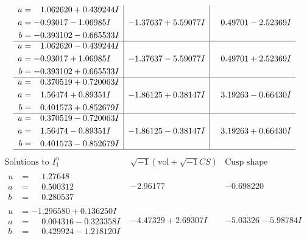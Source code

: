 \documentclass[1p]{elsarticle_modified}
\theoremstyle{definition}
\newcommand{\I}{\sqrt{-1}}
\begin{document}
$$\begin{array}{c|c|c}
\begin{aligned}
u &= \phantom{-}1.062620 + 0.439244 I \\
a &= -0.93017 - 1.06985 I \\
b &= -0.393102 - 0.665533 I\end{aligned}
 & -1.37637 + 5.59077 I & \phantom{-}0.49701 - 2.52369 I \\ \hline\begin{aligned}
u &= \phantom{-}1.062620 - 0.439244 I \\
a &= -0.93017 + 1.06985 I \\
b &= -0.393102 + 0.665533 I\end{aligned}
 & -1.37637 - 5.59077 I & \phantom{-}0.49701 + 2.52369 I \\ \hline\begin{aligned}
u &= \phantom{-}0.370519 + 0.720063 I \\
a &= \phantom{-}1.56474 + 0.89351 I \\
b &= \phantom{-}0.401573 + 0.852679 I\end{aligned}
 & -1.86125 + 0.38147 I & \phantom{-}3.19263 - 0.66430 I \\ \hline\begin{aligned}
u &= \phantom{-}0.370519 - 0.720063 I \\
a &= \phantom{-}1.56474 - 0.89351 I \\
b &= \phantom{-}0.401573 - 0.852679 I\end{aligned}
 & -1.86125 - 0.38147 I & \phantom{-}3.19263 + 0.66430 I\\
 \hline 
 \end{array}$$\newpage$$\begin{array}{c|c|c}  
\text{Solutions to }I^u_{1}& \I (\text{vol} + \sqrt{-1}CS) & \text{Cusp shape}\\
 \hline 
\begin{aligned}
u &= \phantom{-}1.27648\phantom{ +0.000000I} \\
a &= \phantom{-}0.500312\phantom{ +0.000000I} \\
b &= \phantom{-}0.280537\phantom{ +0.000000I}\end{aligned}
 & -2.96177\phantom{ +0.000000I} & -0.698220\phantom{ +0.000000I} \\ \hline\begin{aligned}
u &= -1.296580 + 0.136250 I \\
a &= \phantom{-}0.004316 - 0.323358 I \\
b &= \phantom{-}0.429924 - 1.218120 I\end{aligned}
 & -4.47329 + 2.69307 I & -5.03326 - 5.98784 I \\ \hline\begin{aligned}

\end{aligned}
\end{array}$$
\end{document}
